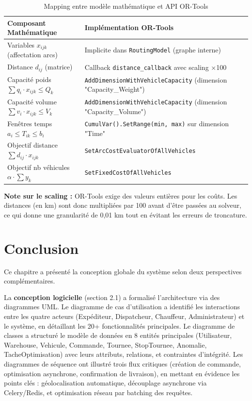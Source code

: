 \documentclass[12pt,a4paper]{report}
\begin{document}
\begin{table}[H]
\centering
\small
\begin{tabular}{@{}lll@{}}
\hline
\textbf{Composant Mathématique} & \textbf{Implémentation OR-Tools} \\
\hline
Variables $x_{ijk}$ (affectation arcs) & Implicite dans \texttt{RoutingModel} (graphe interne) \\
\hline
Distance $d_{ij}$ (matrice) & Callback \texttt{distance\_callback} avec scaling ×100  \\
\hline
Capacité poids $\sum q_i \cdot x_{ijk} \leq Q_k$ & \texttt{AddDimensionWithVehicleCapacity} (dimension "Capacity\_Weight") \\
\hline
Capacité volume $\sum v_i \cdot x_{ijk} \leq V_k$ & \texttt{AddDimensionWithVehicleCapacity} (dimension "Capacity\_Volume") \\
\hline
Fenêtres temps $a_i \leq T_{ik} \leq b_i$ & \texttt{CumulVar().SetRange(min, max)} sur dimension "Time" \\
\hline
Objectif distance $\sum d_{ij} \cdot x_{ijk}$ & \texttt{SetArcCostEvaluatorOfAllVehicles} \\
\hline
Objectif nb véhicules $\alpha \cdot \sum y_k$ & \texttt{SetFixedCostOfAllVehicles} \\
\hline
\end{tabular}
\caption{Mapping entre modèle mathématique et API OR-Tools}
\label{tab:model-ortools}
\end{table}

\textbf{Note sur le scaling :} OR-Tools exige des valeurs entières pour les coûts. Les distances (en km) sont donc multipliées par 100 avant d'être passées au solveur, ce qui donne une granularité de 0,01 km tout en évitant les erreurs de troncature.

\section{Conclusion}

Ce chapitre a présenté la conception globale du système selon deux perspectives complémentaires.

La \textbf{conception logicielle} (section 2.1) a formalisé l'architecture via des diagrammes UML. Le diagramme de cas d'utilisation a identifié les interactions entre les quatre acteurs (Expéditeur, Dispatcheur, Chauffeur, Administrateur) et le système, en détaillant les 20+ fonctionnalités principales. Le diagramme de classes a structuré le modèle de données en 8 entités principales (Utilisateur, Warehouse, Vehicule, Commande, Tournee, StopTournee, Anomalie, TacheOptimisation) avec leurs attributs, relations, et contraintes d'intégrité. Les diagrammes de séquence ont illustré trois flux critiques (création de commande, optimisation asynchrone, confirmation de livraison), en mettant en évidence les points clés : géolocalisation automatique, découplage asynchrone via Celery/Redis, et optimisation réseau par batching des requêtes.
\end{document}
